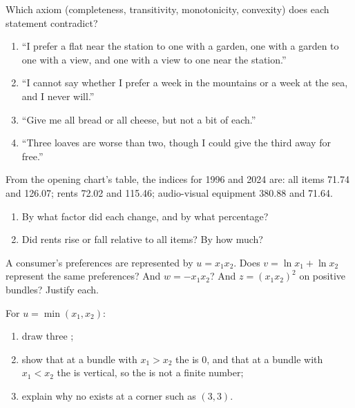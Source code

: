 \begin{exercise}[$\star$]\label{exo:b1:preferences-and-utility:axioms}
Which axiom (completeness, transitivity, monotonicity, convexity) does each
statement contradict?
\begin{enumerate}
  \item ``I prefer a flat near the station to one with a garden, one with a garden to one with a view, and one with a view to one near the station.''
  \item ``I cannot say whether I prefer a week in the mountains or a week at the sea, and I never will.''
  \item ``Give me all bread or all cheese, but not a bit of each.''
  \item ``Three loaves are worse than two, though I could give the third away for free.''
\end{enumerate}
\end{exercise}

\begin{exercise}[$\star$]\label{exo:b1:preferences-and-utility:read-chart}
From the opening chart's table, the indices for 1996 and 2024 are: all
items 71.74 and 126.07; rents 72.02 and 115.46; audio-visual equipment
380.88 and 71.64. %
\begin{enumerate}
  \item By what factor did each change, and by what percentage?
  \item Did rents rise or fall relative to all items? By how much?
\end{enumerate}
\end{exercise}

\begin{exercise}[$\star$]\label{exo:b1:preferences-and-utility:log}
A consumer's preferences are represented by $u = x_1x_2$. Does
$v = \ln x_1 + \ln x_2$ represent the same preferences? And $w = -x_1x_2$?
And $z = (x_1x_2)^2$ on positive bundles? Justify each.
\end{exercise}

\begin{exercise}[$\star\star$]\label{exo:b1:preferences-and-utility:complements}
For $u = \min(x_1, x_2)$:
\begin{enumerate}
  \item draw three ;
  \item show that at a bundle with $x_1 > x_2$ the  is 0, and that at a bundle with $x_1 < x_2$ the  is vertical, so the  is not a finite number;
  \item explain why no  exists at a corner such as $(3, 3)$.
\end{enumerate}
\end{exercise}

